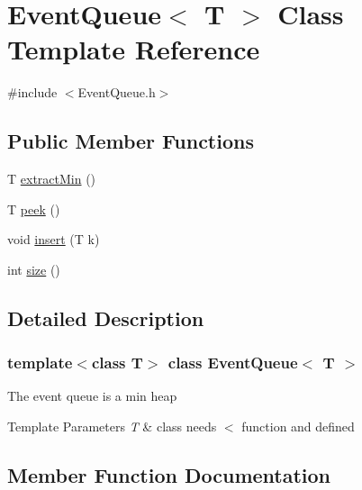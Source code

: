 \hypertarget{classEventQueue}{}\section{Event\+Queue$<$ T $>$ Class Template Reference}
\label{classEventQueue}


{\ttfamily \#include $<$Event\+Queue.\+h$>$}

\subsection*{Public Member Functions}
\begin{DoxyCompactItemize}
\item 
T \hyperlink{classEventQueue_aa2f631077b7f200f65fb87bd3bb60f71}{extract\+Min} ()
\item 
T \hyperlink{classEventQueue_a3e739a353e6ef3fac228a33dd483d730}{peek} ()
\item 
void \hyperlink{classEventQueue_a516dc912aae6d1505ed912fc50f7c33a}{insert} (T k)
\item 
int \hyperlink{classEventQueue_a0ce7b577678a2d182edcf24fdc91397e}{size} ()
\end{DoxyCompactItemize}


\subsection{Detailed Description}
\subsubsection*{template$<$class T$>$\newline
class Event\+Queue$<$ T $>$}

The event queue is a min heap 
\begin{DoxyTemplParams}{Template Parameters}
{\em T} & class needs $<$ function and defined \\
\hline
\end{DoxyTemplParams}


\subsection{Member Function Documentation}
\mbox{\label{classEventQueue_aa2f631077b7f200f65fb87bd3bb60f71}} 
